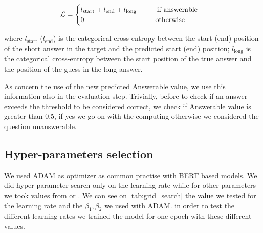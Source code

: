 \documentclass[10pt,hidelinks]{article}
\begin{document}


\begin{equation}\label{eq:loss}
\mathcal{L} = 
\begin{cases}
  l_\text{start} +  l_\text{end} + l_\text{long} \hspace{1cm}\text{if answerable}\\
0 \hspace{3.5cm} \text{otherwise}
\end{cases}
\end{equation}
 
 where $l_{\text{start}}$ ($l_{\text{end}}$)  is the categorical cross-entropy between the start (end) position of the short answer in the target and the predicted start (end) position; $l_{\text{long}}$ is the categorical cross-entropy between the start position of the true answer and the position of the guess in the long answer.

As concern the use of the new predicted Answerable value, we use this information also in the evaluation step. Trivially, before to check if an answer exceeds the threshold to be considered correct, we check if Answerable value is greater than 0.5, if yes we go on with the computing otherwise we considered the question unanswerable.



\subsection{Hyper-parameters selection}
We used ADAM as optimizer as common practise with BERT based models. We did hyper-parameter search only on the learning rate while for other parameters we took values from \cite{alberti} or \cite{see}. We can see on \cref{tab:grid_search} the value we tested for the learning rate and the $\beta_1, \beta_2$ we used with ADAM. in order to test the different learning rates we trained the model for one epoch with these different values.
\end{document}
